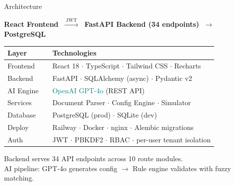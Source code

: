 \documentclass[aspectratio=169,11pt]{beamer}
\begin{document}
\begin{frame}{Architecture}
\begin{center}
{\small
\textbf{React Frontend} $\;\xrightarrow{\;\text{JWT}\;}\;$ \textbf{FastAPI Backend (34 endpoints)} $\;\xrightarrow{}\;$ \textbf{PostgreSQL}
}
\end{center}

\vspace{0.3em}
\begin{center}
{\small
\begin{tabular}{lcl}
\toprule
\textbf{Layer} & & \textbf{Technologies} \\
\midrule
Frontend & & React 18 $\cdot$ TypeScript $\cdot$ Tailwind CSS $\cdot$ Recharts \\
Backend & & FastAPI $\cdot$ SQLAlchemy (async) $\cdot$ Pydantic v2 \\
AI Engine & & \textcolor{teal}{OpenAI GPT-4o} (REST API) \\
Services & & Document Parser $\cdot$ Config Engine $\cdot$ Simulator \\
Database & & PostgreSQL (prod) $\cdot$ SQLite (dev) \\
Deploy & & Railway $\cdot$ Docker $\cdot$ nginx $\cdot$ Alembic migrations \\
Auth & & JWT $\cdot$ PBKDF2 $\cdot$ RBAC $\cdot$ per-user tenant isolation \\
\bottomrule
\end{tabular}
}
\end{center}

\vspace{0.3em}
\begin{center}
{\small\color{ts} Backend serves 34 API endpoints across 10 route modules.\\
AI pipeline: GPT-4o generates config $\to$ Rule engine validates with fuzzy matching.}
\end{center}
\end{frame}
\end{document}
